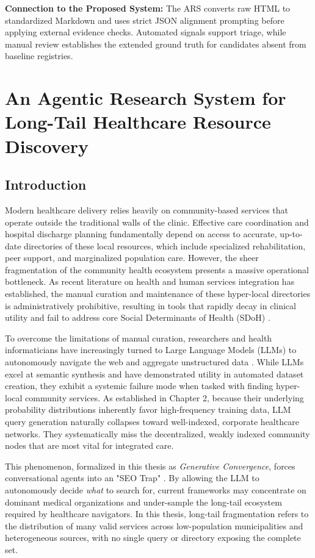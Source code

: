 \documentclass[12pt,oneside]{report}
\begin{document}
\textbf{Connection to the Proposed System:} The ARS converts raw HTML to standardized Markdown and uses strict JSON alignment prompting before applying external evidence checks. Automated signals support triage, while manual review establishes the extended ground truth for candidates absent from baseline registries.

\chapter{An Agentic Research System for Long-Tail Healthcare Resource Discovery}
\section{Introduction}

Modern healthcare delivery relies heavily on community-based services that operate outside the traditional walls of the clinic. Effective care coordination and hospital discharge planning fundamentally depend on access to accurate, up-to-date directories of these local resources, which include specialized rehabilitation, peer support, and marginalized population care. However, the sheer fragmentation of the community health ecosystem presents a massive operational bottleneck. As recent literature on health and human services integration has established, the manual curation and maintenance of these hyper-local directories is administratively prohibitive, resulting in tools that rapidly decay in clinical utility and fail to address core Social Determinants of Health (SDoH) \cite{44, 45}.

To overcome the limitations of manual curation, researchers and health informaticians have increasingly turned to Large Language Models (LLMs) to autonomously navigate the web and aggregate unstructured data \cite{28, 30}. While LLMs excel at semantic synthesis and have demonstrated utility in automated dataset creation, they exhibit a systemic failure mode when tasked with finding hyper-local community services. As established in Chapter 2, because their underlying probability distributions inherently favor high-frequency training data, LLM query generation naturally collapses toward well-indexed, corporate healthcare networks. They systematically miss the decentralized, weakly indexed community nodes that are most vital for integrated care. 

This phenomenon, formalized in this thesis as \textit{Generative Convergence}, forces conversational agents into an "SEO Trap" \cite{24, 25}. By allowing the LLM to autonomously decide \textit{what} to search for, current frameworks may concentrate on dominant medical organizations and under-sample the long-tail ecosystem required by healthcare navigators. In this thesis, long-tail fragmentation refers to the distribution of many valid services across low-population municipalities and heterogeneous sources, with no single query or directory exposing the complete set.
\end{document}
